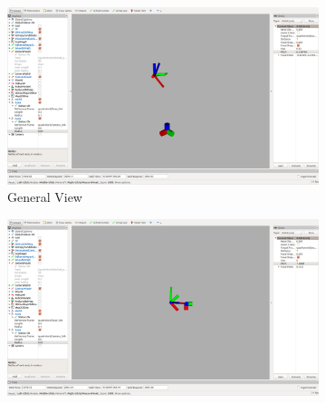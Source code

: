 \documentclass[conf]{new-aiaa}
\begin{document}

\begin{figure}[!t]
	\centering
	\begin{subfigure}[t]{0.3\columnwidth}
           	\centering
          	\includegraphics[trim = {21cm 5cm 20cm 5cm}, clip, height=1.0\textwidth]{mars_general.png}
        		\caption{General View}
    	\end{subfigure}
    	\begin{subfigure}[t]{0.3\columnwidth}
           	\centering
          	\includegraphics[trim = {25cm 6cm 16cm 4cm}, clip, height=1.0\textwidth]{mars_psi.png}

\end{subfigure}
\end{figure}
\end{document}
